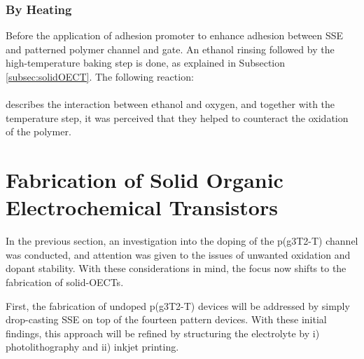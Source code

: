 \subsubsection{By Heating}


Before the application of adhesion promoter to enhance adhesion between SSE and patterned polymer channel and gate. An ethanol rinsing followed by the high-temperature baking step is done, as explained in Subsection \ref{subsec:solidOECT}. The following reaction: \\

\hspace{3cm}  
\\

describes the interaction between ethanol and oxygen, and together with the temperature step, it was perceived that they helped to counteract the oxidation of the polymer.


\section{Fabrication of Solid Organic Electrochemical Transistors}

In the previous section, an investigation into the doping of the p(g3T2-T) channel was conducted, and attention was given to the issues of unwanted oxidation and dopant stability. With these considerations in mind, the focus now shifts to the fabrication of solid-OECTs. 

First, the fabrication of undoped p(g3T2-T) devices will be addressed by simply drop-casting SSE on top of the fourteen pattern devices. With these initial findings, this approach will be refined by structuring the electrolyte by i) photolithography \cite{weissbachPhotopatternableSolidElectrolyte2022} and ii) inkjet printing. 


